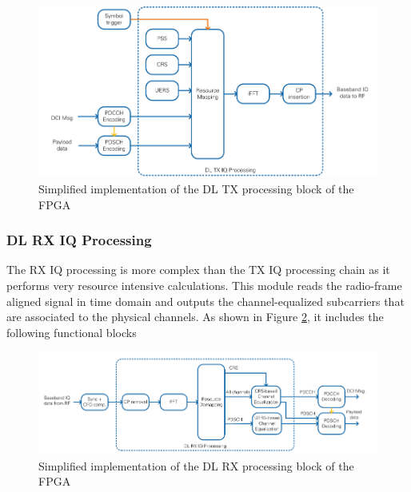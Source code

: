 \begin{figure}[H]
    \centering
    \includegraphics[width=\linewidth]{images/DLFPGATXImpl.png}
    \caption{Simplified implementation of the DL TX processing block of the FPGA}
    \label{fig:LTEAFWFPGADLTXProc}
\end{figure}

\subsubsection{DL RX IQ Processing}\label{sssec:DLRXIQProc}

The RX IQ processing is more complex than the TX IQ processing chain as it performs very resource intensive calculations. This module reads the radio-frame aligned signal in time domain and outputs the channel-equalized subcarriers that are associated to the physical channels. As shown in Figure \ref{fig:LTEAFWFPGADLRXProc}, it includes the following functional blocks

\begin{figure}[!htb]
    \centering
    \includegraphics[width=\linewidth]{images/DLFPGARXImpl.png}
    \caption{Simplified implementation of the DL RX processing block of the FPGA}
    \label{fig:LTEAFWFPGADLRXProc}
\end{figure}

